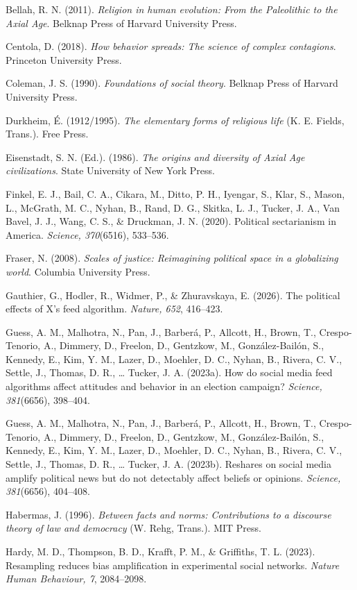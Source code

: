 \documentclass[
  11pt,
]{article}
\begin{document}
Bellah, R. N. (2011). \emph{Religion in human evolution: From the
Paleolithic to the Axial Age}. Belknap Press of Harvard University
Press.

Centola, D. (2018). \emph{How behavior spreads: The science of complex
contagions}. Princeton University Press.

Coleman, J. S. (1990). \emph{Foundations of social theory}. Belknap
Press of Harvard University Press.

Durkheim, É. (1912/1995). \emph{The elementary forms of religious life}
(K. E. Fields, Trans.). Free Press.

Eisenstadt, S. N. (Ed.). (1986). \emph{The origins and diversity of
Axial Age civilizations}. State University of New York Press.

Finkel, E. J., Bail, C. A., Cikara, M., Ditto, P. H., Iyengar, S., Klar,
S., Mason, L., McGrath, M. C., Nyhan, B., Rand, D. G., Skitka, L. J.,
Tucker, J. A., Van Bavel, J. J., Wang, C. S., \& Druckman, J. N. (2020).
Political sectarianism in America. \emph{Science, 370}(6516), 533--536.

Fraser, N. (2008). \emph{Scales of justice: Reimagining political space
in a globalizing world}. Columbia University Press.

Gauthier, G., Hodler, R., Widmer, P., \& Zhuravskaya, E. (2026). The
political effects of X's feed algorithm. \emph{Nature, 652}, 416--423.

Guess, A. M., Malhotra, N., Pan, J., Barberá, P., Allcott, H., Brown,
T., Crespo-Tenorio, A., Dimmery, D., Freelon, D., Gentzkow, M.,
González-Bailón, S., Kennedy, E., Kim, Y. M., Lazer, D., Moehler, D. C.,
Nyhan, B., Rivera, C. V., Settle, J., Thomas, D. R., \ldots{} Tucker, J.
A. (2023a). How do social media feed algorithms affect attitudes and
behavior in an election campaign? \emph{Science, 381}(6656), 398--404.

Guess, A. M., Malhotra, N., Pan, J., Barberá, P., Allcott, H., Brown,
T., Crespo-Tenorio, A., Dimmery, D., Freelon, D., Gentzkow, M.,
González-Bailón, S., Kennedy, E., Kim, Y. M., Lazer, D., Moehler, D. C.,
Nyhan, B., Rivera, C. V., Settle, J., Thomas, D. R., \ldots{} Tucker, J.
A. (2023b). Reshares on social media amplify political news but do not
detectably affect beliefs or opinions. \emph{Science, 381}(6656),
404--408.

Habermas, J. (1996). \emph{Between facts and norms: Contributions to a
discourse theory of law and democracy} (W. Rehg, Trans.). MIT Press.

Hardy, M. D., Thompson, B. D., Krafft, P. M., \& Griffiths, T. L.
(2023). Resampling reduces bias amplification in experimental social
networks. \emph{Nature Human Behaviour, 7}, 2084--2098.
\end{document}
